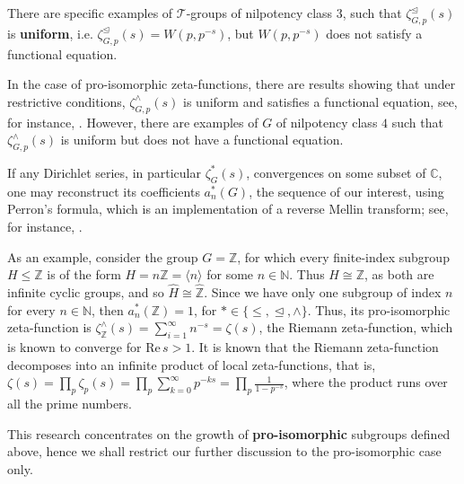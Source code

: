 \documentclass[12pt]{article}
\begin{document}
There are specific examples of $\mathcal{T}$-groups of nilpotency class $3$, such that $\zeta_{G,p}^{\trianglelefteq}(s)$ is \textbf{uniform}, i.e. $\zeta_{G,p}^{\trianglelefteq}(s)=W(p,p^{-s})$, but $W(p,p^{-s})$ does not satisfy a functional equation.

In the case of pro-isomorphic zeta-functions, there are results showing that under restrictive conditions, $\zeta_{G,p}^{\wedge}(s)$ is uniform and satisfies a functional equation, see, for instance, \cite{BermanKlopschOnn}. However, there are examples of $G$ of nilpotency class $4$ such that $\zeta_{G,p}^{\wedge}(s)$ is uniform but does not have a functional equation.

If any Dirichlet series, in particular $\zeta_{G}^{\ast}(s)$, convergences on some subset of $\mathbb{C}$, one may reconstruct its coefficients $a_{n}^{\ast}(G)$, the sequence of our interest, using Perron's formula, which is an implementation of a reverse Mellin transform; see, for instance, \cite{MontgomeryVaughan}.\par
As an example, consider the group $G=\mathbb{Z}$, for which every finite-index subgroup $H\leq{\mathbb{Z}}$ is of the form $H=n\mathbb{Z}=\langle n\rangle$ for some $n\in\mathbb{N}$. Thus $H\cong \mathbb{Z}$, as both are infinite cyclic groups, and so $\widehat{H}\cong\widehat{\mathbb{Z}}$. Since we have only one subgroup of index $n$ for every $n\in\mathbb{N}$, then $a_{n}^{\ast}(\mathbb{Z})=1$, for $\ast\in\{\leq,\trianglelefteq,\wedge\}$. Thus, its pro-isomorphic zeta-function is $\zeta_{\mathbb{Z}}^{\wedge}(s)=\sum_{i=1}^{\infty}n^{-s}=\zeta(s)$, the Riemann zeta-function, which is known to converge for $\mathrm{Re}\,s>1$. It is known that the Riemann zeta-function decomposes into an infinite product of local zeta-functions, that is, $\zeta(s)=\prod_p\zeta_p(s)=\prod_p\sum_{k=0}^\infty p^{-ks}=\prod_p\frac{1}{1-p^{-s}}$, where the product runs over all the prime numbers.\par
This research concentrates on the growth of \textbf{pro-isomorphic} subgroups defined above, hence we shall restrict our further discussion to the pro-isomorphic case only.
\end{document}
